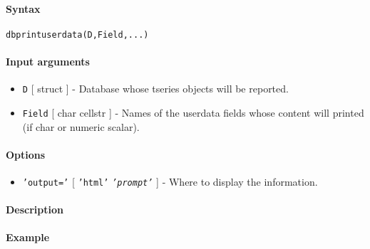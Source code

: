 


	\paragraph{Syntax}\label{syntax}

\begin{verbatim}
dbprintuserdata(D,Field,...)
\end{verbatim}

\paragraph{Input arguments}\label{input-arguments}

\begin{itemize}
\item
  \texttt{D} {[} struct {]} - Database whose tseries objects will be
  reported.
\item
  \texttt{Field} {[} char \textbar{} cellstr {]} - Names of the userdata
  fields whose content will printed (if char or numeric scalar).
\end{itemize}

\paragraph{Options}\label{options}

\begin{itemize}
\itemsep1pt\parskip0pt
\item
  \texttt{'output='} {[} \texttt{'html'} \textbar{}
  \emph{\texttt{'prompt'}} {]} - Where to display the information.
\end{itemize}

\paragraph{Description}\label{description}

\paragraph{Example}\label{example}


